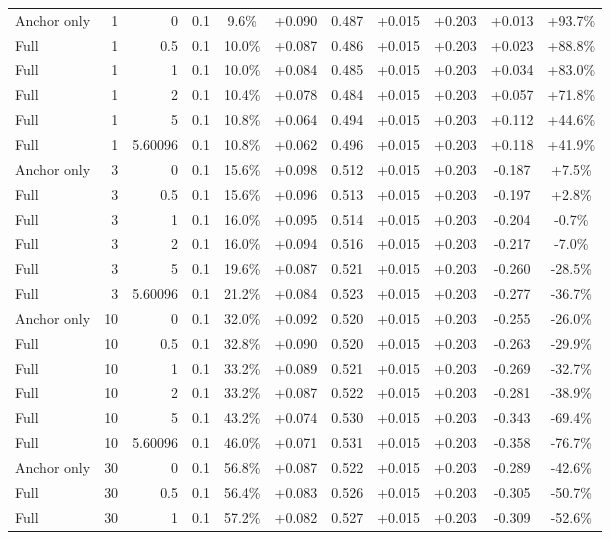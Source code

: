 \begin{table}[htbp]
\begin{tabular}{lrrrccccccc}
Anchor only & 1 & 0 & 0.1 & 9.6\% & +0.090 & 0.487 & +0.015 & +0.203 & +0.013 & +93.7\% \\
Full & 1 & 0.5 & 0.1 & 10.0\% & +0.087 & 0.486 & +0.015 & +0.203 & +0.023 & +88.8\% \\
Full & 1 & 1 & 0.1 & 10.0\% & +0.084 & 0.485 & +0.015 & +0.203 & +0.034 & +83.0\% \\
Full & 1 & 2 & 0.1 & 10.4\% & +0.078 & 0.484 & +0.015 & +0.203 & +0.057 & +71.8\% \\
Full & 1 & 5 & 0.1 & 10.8\% & +0.064 & 0.494 & +0.015 & +0.203 & +0.112 & +44.6\% \\
Full & 1 & 5.60096 & 0.1 & 10.8\% & +0.062 & 0.496 & +0.015 & +0.203 & +0.118 & +41.9\% \\
Anchor only & 3 & 0 & 0.1 & 15.6\% & +0.098 & 0.512 & +0.015 & +0.203 & -0.187 & +7.5\% \\
Full & 3 & 0.5 & 0.1 & 15.6\% & +0.096 & 0.513 & +0.015 & +0.203 & -0.197 & +2.8\% \\
Full & 3 & 1 & 0.1 & 16.0\% & +0.095 & 0.514 & +0.015 & +0.203 & -0.204 & -0.7\% \\
Full & 3 & 2 & 0.1 & 16.0\% & +0.094 & 0.516 & +0.015 & +0.203 & -0.217 & -7.0\% \\
Full & 3 & 5 & 0.1 & 19.6\% & +0.087 & 0.521 & +0.015 & +0.203 & -0.260 & -28.5\% \\
Full & 3 & 5.60096 & 0.1 & 21.2\% & +0.084 & 0.523 & +0.015 & +0.203 & -0.277 & -36.7\% \\
Anchor only & 10 & 0 & 0.1 & 32.0\% & +0.092 & 0.520 & +0.015 & +0.203 & -0.255 & -26.0\% \\
Full & 10 & 0.5 & 0.1 & 32.8\% & +0.090 & 0.520 & +0.015 & +0.203 & -0.263 & -29.9\% \\
Full & 10 & 1 & 0.1 & 33.2\% & +0.089 & 0.521 & +0.015 & +0.203 & -0.269 & -32.7\% \\
Full & 10 & 2 & 0.1 & 33.2\% & +0.087 & 0.522 & +0.015 & +0.203 & -0.281 & -38.9\% \\
Full & 10 & 5 & 0.1 & 43.2\% & +0.074 & 0.530 & +0.015 & +0.203 & -0.343 & -69.4\% \\
Full & 10 & 5.60096 & 0.1 & 46.0\% & +0.071 & 0.531 & +0.015 & +0.203 & -0.358 & -76.7\% \\
Anchor only & 30 & 0 & 0.1 & 56.8\% & +0.087 & 0.522 & +0.015 & +0.203 & -0.289 & -42.6\% \\
Full & 30 & 0.5 & 0.1 & 56.4\% & +0.083 & 0.526 & +0.015 & +0.203 & -0.305 & -50.7\% \\
Full & 30 & 1 & 0.1 & 57.2\% & +0.082 & 0.527 & +0.015 & +0.203 & -0.309 & -52.6\% \\

\end{tabular}
\end{table}
